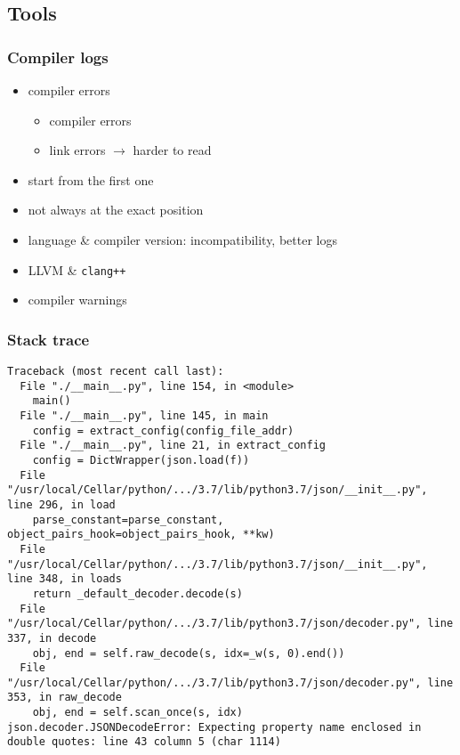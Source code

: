 
\subsection{Tools}

\begin{frame}
    \frametitle{Compiler logs}
    \begin{itemize}[<+->]
        \item compiler errors
        \begin{itemize}[<+->]
            \item compiler errors
            \item link errors \onslide<+-> $\longrightarrow$ harder to read
        \end{itemize}
        \item start from the first one
        \item not always at the exact position
        \item language \& compiler version\onslide<+->: incompatibility\onslide<+->, better logs
        \item LLVM \& \texttt{clang++}
        \item compiler warnings
    \end{itemize}
\end{frame}

\begin{frame}[fragile]
    \frametitle{Stack trace}
    \begin{Verbatim}[fontsize=\tiny]
Traceback (most recent call last):
  File "./__main__.py", line 154, in <module>
    main()
  File "./__main__.py", line 145, in main
    config = extract_config(config_file_addr)
  File "./__main__.py", line 21, in extract_config
    config = DictWrapper(json.load(f))
  File "/usr/local/Cellar/python/.../3.7/lib/python3.7/json/__init__.py", line 296, in load
    parse_constant=parse_constant, object_pairs_hook=object_pairs_hook, **kw)
  File "/usr/local/Cellar/python/.../3.7/lib/python3.7/json/__init__.py", line 348, in loads
    return _default_decoder.decode(s)
  File "/usr/local/Cellar/python/.../3.7/lib/python3.7/json/decoder.py", line 337, in decode
    obj, end = self.raw_decode(s, idx=_w(s, 0).end())
  File "/usr/local/Cellar/python/.../3.7/lib/python3.7/json/decoder.py", line 353, in raw_decode
    obj, end = self.scan_once(s, idx)
json.decoder.JSONDecodeError: Expecting property name enclosed in double quotes: line 43 column 5 (char 1114)
    \end{Verbatim}
\end{frame}

